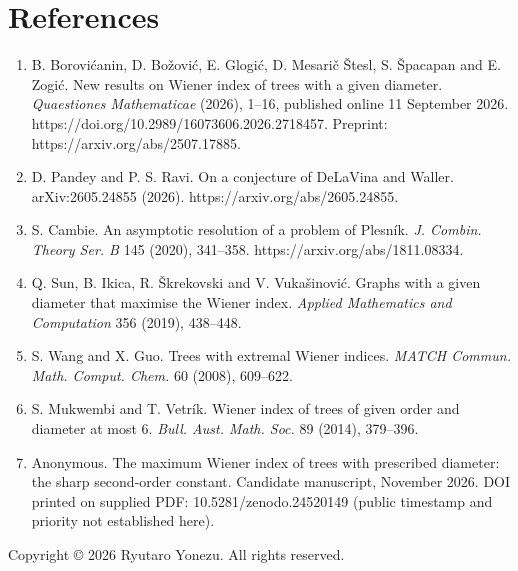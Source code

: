 \documentclass[
  10pt,
  a4paper,
]{article}
\providecommand{\tightlist}{%
  \setlength{\itemsep}{0pt}\setlength{\parskip}{0pt}}
\begin{document}
\section{References}\label{references}

\begin{enumerate}
\def\labelenumi{\arabic{enumi}.}
\tightlist
\item
  B. Borovićanin, D. Božović, E. Glogić, D. Mesarič Štesl, S. Špacapan
  and E. Zogić. New results on Wiener index of trees with a given
  diameter. \emph{Quaestiones Mathematicae} (2026), 1--16, published
  online 11 September 2026.
  https://doi.org/10.2989/16073606.2026.2718457. Preprint:
  https://arxiv.org/abs/2507.17885.
\item
  D. Pandey and P. S. Ravi. On a conjecture of DeLaVina and Waller.
  arXiv:2605.24855 (2026). https://arxiv.org/abs/2605.24855.
\item
  S. Cambie. An asymptotic resolution of a problem of Plesník. \emph{J.
  Combin. Theory Ser. B} 145 (2020), 341--358.
  https://arxiv.org/abs/1811.08334.
\item
  Q. Sun, B. Ikica, R. Škrekovski and V. Vukašinović. Graphs with a
  given diameter that maximise the Wiener index. \emph{Applied
  Mathematics and Computation} 356 (2019), 438--448.
\item
  S. Wang and X. Guo. Trees with extremal Wiener indices. \emph{MATCH
  Commun. Math. Comput. Chem.} 60 (2008), 609--622.
\item
  S. Mukwembi and T. Vetrík. Wiener index of trees of given order and
  diameter at most 6. \emph{Bull. Aust. Math. Soc.} 89 (2014), 379--396.
\item
  Anonymous. The maximum Wiener index of trees with prescribed diameter:
  the sharp second-order constant. Candidate manuscript, November 2026.
  DOI printed on supplied PDF: 10.5281/zenodo.24520149 (public timestamp
  and priority not established here).
\end{enumerate}

Copyright © 2026 Ryutaro Yonezu. All rights reserved.
\end{document}
